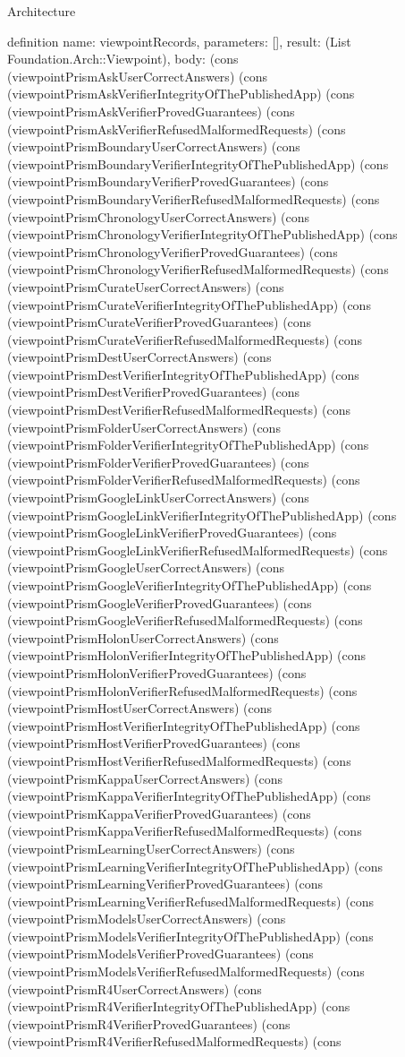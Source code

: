 \begin{lexlean}{Architecture}
\begin{semanticmodule}
definition{
  name: viewpointRecords,
  parameters: [],
  result: (List Foundation.Arch::Viewpoint),
  body: (cons (viewpointPrismAskUserCorrectAnswers) (cons (viewpointPrismAskVerifierIntegrityOfThePublishedApp) (cons (viewpointPrismAskVerifierProvedGuarantees) (cons (viewpointPrismAskVerifierRefusedMalformedRequests) (cons (viewpointPrismBoundaryUserCorrectAnswers) (cons (viewpointPrismBoundaryVerifierIntegrityOfThePublishedApp) (cons (viewpointPrismBoundaryVerifierProvedGuarantees) (cons (viewpointPrismBoundaryVerifierRefusedMalformedRequests) (cons (viewpointPrismChronologyUserCorrectAnswers) (cons (viewpointPrismChronologyVerifierIntegrityOfThePublishedApp) (cons (viewpointPrismChronologyVerifierProvedGuarantees) (cons (viewpointPrismChronologyVerifierRefusedMalformedRequests) (cons (viewpointPrismCurateUserCorrectAnswers) (cons (viewpointPrismCurateVerifierIntegrityOfThePublishedApp) (cons (viewpointPrismCurateVerifierProvedGuarantees) (cons (viewpointPrismCurateVerifierRefusedMalformedRequests) (cons (viewpointPrismDestUserCorrectAnswers) (cons (viewpointPrismDestVerifierIntegrityOfThePublishedApp) (cons (viewpointPrismDestVerifierProvedGuarantees) (cons (viewpointPrismDestVerifierRefusedMalformedRequests) (cons (viewpointPrismFolderUserCorrectAnswers) (cons (viewpointPrismFolderVerifierIntegrityOfThePublishedApp) (cons (viewpointPrismFolderVerifierProvedGuarantees) (cons (viewpointPrismFolderVerifierRefusedMalformedRequests) (cons (viewpointPrismGoogleLinkUserCorrectAnswers) (cons (viewpointPrismGoogleLinkVerifierIntegrityOfThePublishedApp) (cons (viewpointPrismGoogleLinkVerifierProvedGuarantees) (cons (viewpointPrismGoogleLinkVerifierRefusedMalformedRequests) (cons (viewpointPrismGoogleUserCorrectAnswers) (cons (viewpointPrismGoogleVerifierIntegrityOfThePublishedApp) (cons (viewpointPrismGoogleVerifierProvedGuarantees) (cons (viewpointPrismGoogleVerifierRefusedMalformedRequests) (cons (viewpointPrismHolonUserCorrectAnswers) (cons (viewpointPrismHolonVerifierIntegrityOfThePublishedApp) (cons (viewpointPrismHolonVerifierProvedGuarantees) (cons (viewpointPrismHolonVerifierRefusedMalformedRequests) (cons (viewpointPrismHostUserCorrectAnswers) (cons (viewpointPrismHostVerifierIntegrityOfThePublishedApp) (cons (viewpointPrismHostVerifierProvedGuarantees) (cons (viewpointPrismHostVerifierRefusedMalformedRequests) (cons (viewpointPrismKappaUserCorrectAnswers) (cons (viewpointPrismKappaVerifierIntegrityOfThePublishedApp) (cons (viewpointPrismKappaVerifierProvedGuarantees) (cons (viewpointPrismKappaVerifierRefusedMalformedRequests) (cons (viewpointPrismLearningUserCorrectAnswers) (cons (viewpointPrismLearningVerifierIntegrityOfThePublishedApp) (cons (viewpointPrismLearningVerifierProvedGuarantees) (cons (viewpointPrismLearningVerifierRefusedMalformedRequests) (cons (viewpointPrismModelsUserCorrectAnswers) (cons (viewpointPrismModelsVerifierIntegrityOfThePublishedApp) (cons (viewpointPrismModelsVerifierProvedGuarantees) (cons (viewpointPrismModelsVerifierRefusedMalformedRequests) (cons (viewpointPrismR4UserCorrectAnswers) (cons (viewpointPrismR4VerifierIntegrityOfThePublishedApp) (cons (viewpointPrismR4VerifierProvedGuarantees) (cons (viewpointPrismR4VerifierRefusedMalformedRequests) (cons }
\end{semanticmodule}
\end{lexlean}
